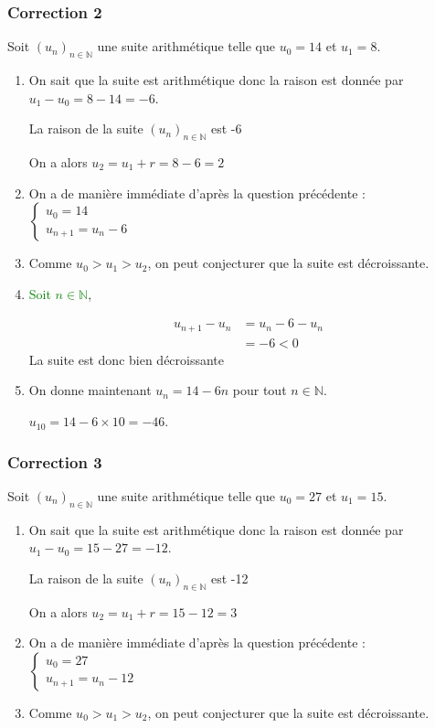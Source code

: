 \documentclass[15pt, mathserif]{beamer}
\newcommand{\N}{\mathbb{N}}			%
\newcommand{\st}[1]{$(#1_n)_{n \in \N}$}
\begin{document}
\begin{frame}
\vspace{-10mm}
	\frametitle{Correction 2}
Soit \st{u} une suite arithmétique telle que $u_0=14$ et $u_1=8$. 
 
 \begin{enumerate} 
 	 \item On sait que la suite est arithmétique donc la raison est donnée par $u_1-u_0= 8-14=-6$. 
 
 La raison de la suite \st{u} est -6
 
 On a alors $u_2=u_1+r=8-6=2$ 
 \vfil 
 	 \item On a de manière immédiate d'après la question précédente : 
 \hfil$\begin{cases} 
 u_0=14 \\ 
 u_{n+1}=u_n-6 
 \end{cases}$ 
 \vfil 
 	 \item Comme $u_0>u_1>u_2$, on peut conjecturer que la suite est décroissante.
 \end{enumerate} 
 
 \end{frame} 
 
 \begin{frame}  
 \begin{enumerate} \setcounter{enumi}{3} 
 	 \item \textcolor{green}{Soit $n \in \N$}, 
 
  \begin{align*} 
 u_{n+1}-u_n &= u_n -6-u_n \\ 
 &= -6<0 
 \end{align*}La suite est donc bien décroissante
 \vfil 
 	 \item On donne maintenant $u_n=14-6n$ pour tout $n \in \N$. 
 
  \hfil$u_{10}=14-6\times 10=-46$. 
 
 \end{enumerate} \end{frame}


\begin{frame}
\vspace{-10mm}
	\frametitle{Correction 3}
Soit \st{u} une suite arithmétique telle que $u_0=27$ et $u_1=15$. 
 
 \begin{enumerate} 
 	 \item On sait que la suite est arithmétique donc la raison est donnée par $u_1-u_0= 15-27=-12$. 
 
 La raison de la suite \st{u} est -12
 
 On a alors $u_2=u_1+r=15-12=3$ 
 \vfil 
 	 \item On a de manière immédiate d'après la question précédente : 
 \hfil$\begin{cases} 
 u_0=27 \\ 
 u_{n+1}=u_n-12 
 \end{cases}$ 
 \vfil 
 	 \item Comme $u_0>u_1>u_2$, on peut conjecturer que la suite est décroissante.
 \end{enumerate} 
 
 \end{frame} 
 
\end{document}

